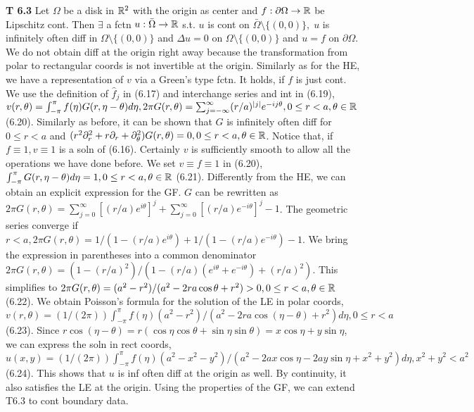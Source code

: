 {\bf T 6.3} Let $\Omega$ be a disk in $\mathbb{R}^2$ with the origin as center and $f: \partial \Omega \rightarrow \mathbb{R}$ be Lipschitz cont. Then $\exists$ a fctn $u: \bar{\Omega} \rightarrow \mathbb{R}$ s.t. $u$ is cont on $\bar{\Omega} \setminus \{(0,0)\}, \; u$ is infinitely often diff in $\Omega \setminus \{(0,0)\}$ and $\Delta u = 0 $ on $\Omega \setminus \{(0,0)\}$ and $u = f$ on $ \partial \Omega$. We do not obtain diff at the origin right away because the transformation from polar to rectangular coords is not invertible at the origin. Similarly as for the HE, we have a representation of $v$ via a Green's type fctn.  It holds, if $f$ is just cont. We use the definition of $\hat{f}_j$ in (6.17) and interchange series and int in (6.19), $v(r, \theta) = \int_{-\pi}^{\pi} f(\eta) G(r, \eta - \theta) d \eta, 2 \pi G(r, \theta) = \sum_{j=-\infty}^{\infty}(r/a)^{|j|}e^{-ij \theta}, 0 \leq r < a, \theta \in \mathbb{R}$ (6.20). Similarly as before, it can be shown that $G$ is infinitely often diff for $0 \leq r < a$ and $(r^2 \partial_r^2 + r \partial_r + \partial_{\theta}^2)G(r, \theta) = 0, 0 \leq r < a, \theta \in \mathbb{R}$. Notice that, if $f \equiv 1, v \equiv 1$ is a soln of (6.16). Certainly $v$ is sufficiently smooth to allow all the operations we have done before.  We set $v \equiv f \equiv 1$ in (6.20), $\int_{-\pi}^{\pi} G(r, \eta - \theta) d \eta = 1, 0 \leq r < a, \theta \in \mathbb{R}$ (6.21). Differently from the HE, we can obtain an explicit expression for the GF. $G$ can be rewritten as $2 \pi G(r, \theta)=\sum_{j=0}^{\infty}[(r/a)e^{i \theta}]^j + \sum_{j=0}^{\infty}[(r/a)e^{-i \theta}]^j -1$. The geometric series converge if $r < a, 2 \pi G(r, \theta) = 1/(1-(r/a)e^{i \theta})+ 1/(1-(r/a)e^{-i \theta})-1$. We bring the expression in parentheses into a common denominator $2 \pi G(r, \theta) = (1-(r/a)^2)/(1-(r/a)(e^{i \theta}+e^{-i \theta}) + (r/a)^2)$. This simplifies to $2 \pi G(r, \theta) = (a^2-r^2)/(a^2-2ra \cos \theta +r^2) > 0, 0 \leq r < a, \theta \in \mathbb{R}$ (6.22). We obtain Poisson's formula for the solution of the LE in polar coords, $v (r, \theta) = (1/(2 \pi))\int_{-\pi}^{\pi} f(\eta) (a^2-r^2)/(a^2-2ra \cos ( \eta - \theta) +r^2) d \eta, 0 \leq r < a$ (6.23). Since $r \cos(\eta - \theta) = r(\cos \eta \cos \theta + \sin \eta \sin \theta) = x \cos \eta + y \sin \eta$, we can express the soln in rect coords, $u(x,y) =  (1/(2 \pi))\int_{-\pi}^{\pi} f(\eta) (a^2-x^2-y^2)/(a^2-2ax \cos \eta - 2 a y \sin \eta + x^2 + y^2) d \eta, x^2 + y^2 < a^2$ (6.24). This shows that $u$ is inf often diff at the origin as well. By continuity, it also satisfies the LE at the origin.  Using the properties of the GF, we can extend T6.3 to cont boundary data. 